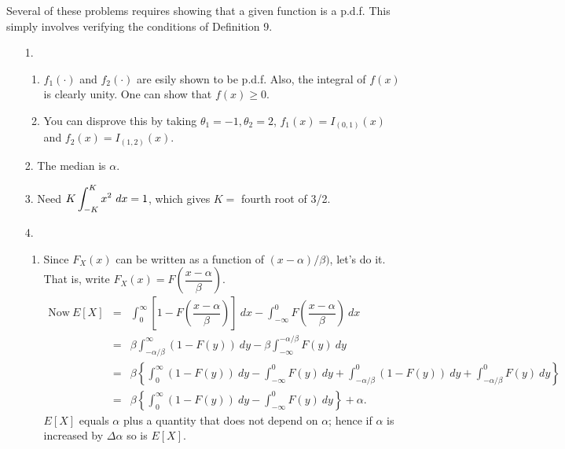\noindent Several of these problems requires showing that a given function is a p.d.f.  This simply involves verifying the conditions of Definition 9.
\begin{enumerate}
	\item[1.] \begin{enumerate}
		
		\item $f_1(\cdot)$ and $f_2(\cdot)$ are esily shown to be p.d.f.  Also, the integral of $f(x)$ is clearly unity.  One can show that $f(x) \ge 0$.
		
		\item You can disprove this by taking $\theta_1 = -1, \theta_2 = 2$, $f_1(x) = I_{(0,1)}(x)$ and $f_2(x) = I_{(1,2)}(x)$.
		
	\end{enumerate}

	\item[2.] The median is $\alpha$.
	
	\item[3.] Need $\displaystyle K \int_{-K}^{K} x^2\ dx = 1$, which gives $K=$ fourth root of 3/2.
	
	\item[4.] \begin{enumerate}
	
		\item Since $F_X(x)$ can be written as a function of $(x- \alpha)/\beta)$, let's do it.  That is, write $F_X(x) = F\left(\dfrac{x-\alpha}{\beta}\right)$.
		\begin{eqnarray*}
		\text{Now}\ E[X] &=& \int_{0}^{\infty} \left[ 1 - F\left(\dfrac{x- \alpha}{\beta}\right) \right]\ dx- \int_{-\infty}^{0} F\left(\dfrac{x- \alpha}{\beta}\right)\ dx \\
		&=& \beta \int_{-\alpha/\beta}^{\infty}(1- F(y))\ dy- \beta \int_{-\infty}^{-\alpha/\beta} F(y)\ dy \\
		&=& \beta \left\{ \int_{0}^{\infty} (1- F(y))\ dy - \int_{-\infty}^{0} F(y)\ dy + \int_{-\alpha/\beta}^{0}(1- F(y))\ dy +  \int_{-\alpha/\beta}^{0} F(y)\ dy \right\} \\
		&=&  \beta \left\{ \int_{0}^{\infty} (1- F(y))\ dy - \int_{-\infty}^{0} F(y)\ dy  \right\} + \alpha. 
		\end{eqnarray*}
		$E[X]$ equals $\alpha$ plus a quantity that does not depend on $\alpha$; hence if $\alpha$ is increased by $\Delta\alpha$ so is $E[X]$.
		
		\end{enumerate} 
	

\end{enumerate}
